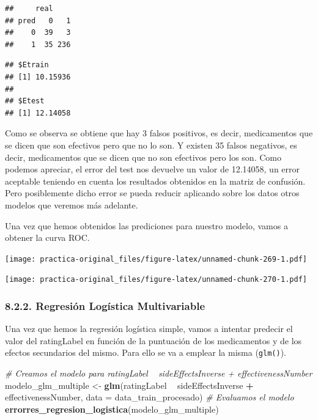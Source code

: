 \documentclass[spanish,]{article}
\newenvironment{Shaded}{\begin{snugshade}}{\end{snugshade}}
\newcommand{\KeywordTok}[1]{\textcolor[rgb]{0.13,0.29,0.53}{\textbf{#1}}}
\newcommand{\DataTypeTok}[1]{\textcolor[rgb]{0.13,0.29,0.53}{#1}}
\newcommand{\StringTok}[1]{\textcolor[rgb]{0.31,0.60,0.02}{#1}}
\newcommand{\CommentTok}[1]{\textcolor[rgb]{0.56,0.35,0.01}{\textit{#1}}}
\newcommand{\OperatorTok}[1]{\textcolor[rgb]{0.81,0.36,0.00}{\textbf{#1}}}
\newcommand{\NormalTok}[1]{#1}
\begin{document}
\begin{verbatim}
##     real
## pred   0   1
##    0  39   3
##    1  35 236
\end{verbatim}

\begin{verbatim}
## $Etrain
## [1] 10.15936
## 
## $Etest
## [1] 12.14058
\end{verbatim}

Como se observa se obtiene que hay 3 falsos positivos, es decir,
medicamentos que se dicen que son efectivos pero que no lo son. Y
existen 35 falsos negativos, es decir, medicamentos que se dicen que no
son efectivos pero los son. Como podemos apreciar, el error del test nos
devuelve un valor de 12.14058, un error aceptable teniendo en cuenta los
resultados obtenidos en la matriz de confusión. Pero posiblemente dicho
error se pueda reducir aplicando sobre los datos otros modelos que
veremos más adelante.

Una vez que hemos obtenidos las prediciones para nuestro modelo, vamos a
obtener la curva ROC.

\texttt{[image: practica-original\_files/figure-latex/unnamed-chunk-269-1.pdf]}

\texttt{[image: practica-original\_files/figure-latex/unnamed-chunk-270-1.pdf]}

\subsubsection{8.2.2. Regresión Logística
Multivariable}\label{regresion-logistica-multivariable}

Una vez que hemos la regresión logística simple, vamos a intentar
predecir el valor del ratingLabel en función de la puntuación de los
medicamentos y de los efectos secundarios del mismo. Para ello se va a
emplear la misma (\texttt{glm()}).

\begin{Shaded}
\begin{Highlighting}[]
\CommentTok{# Creamos el modelo para ratingLabel ~ sideEffectsInverse + effectivenessNumber}
\NormalTok{modelo_glm_multiple <-}\StringTok{ }\KeywordTok{glm}\NormalTok{(ratingLabel }\OperatorTok{~}\StringTok{ }\NormalTok{sideEffectsInverse }\OperatorTok{+}\StringTok{ }\NormalTok{effectivenessNumber, }\DataTypeTok{data =}\NormalTok{ data_train_procesado)}
\CommentTok{# Evaluamos el modelo}
\KeywordTok{errorres_regresion_logistica}\NormalTok{(modelo_glm_multiple)}
\end{Highlighting}
\end{Shaded}
\end{document}

